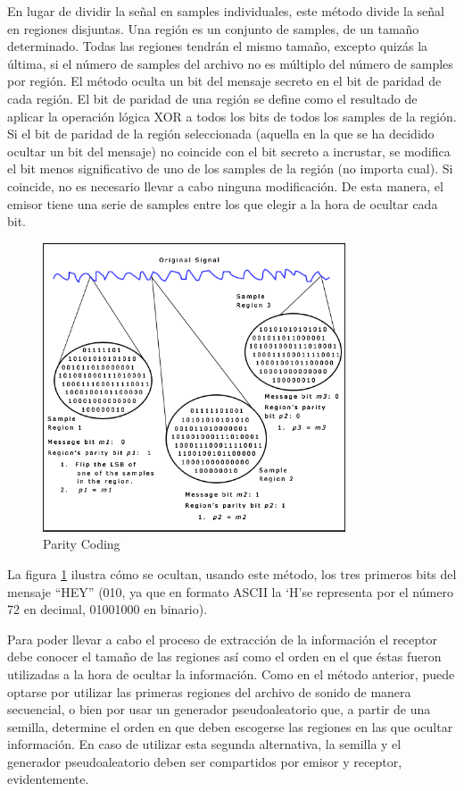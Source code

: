 \documentclass[12pt]{article}
\begin{document}
En lugar de dividir la señal en samples individuales, este método divide la señal en regiones disjuntas. Una región es un conjunto de samples, de un tamaño determinado. Todas las regiones tendrán el mismo tamaño, excepto quizás la última, si el número de samples del archivo no es múltiplo del número de samples por región. El método oculta un bit del mensaje secreto en el bit de paridad de cada región. El bit de paridad de una región se define como el resultado de aplicar la operación lógica XOR a todos los bits de todos los samples de la región. Si el bit de paridad de la región seleccionada (aquella en la que se ha decidido ocultar un bit del mensaje) no coincide con el bit secreto a incrustar, se modifica el bit menos significativo de uno de los samples de la región (no importa cual). Si coincide, no es necesario llevar a cabo ninguna modificación. De esta manera, el emisor tiene una serie de samples entre los que elegir a la hora de ocultar cada bit.

\begin{figure}
  \centering
    \includegraphics[width=0.8\textwidth]{img/parity}
  \caption{Parity Coding}
  \label{paritycoding}
\end{figure}

La figura \ref{paritycoding} ilustra cómo se ocultan, usando este método, los tres primeros bits del mensaje ``HEY'' (010, ya que en formato ASCII la `H'\space se representa por el número 72 en decimal, 01001000 en binario).

Para poder llevar a cabo el proceso de extracción de la información el receptor debe conocer el tamaño de las regiones así como el orden en el que éstas fueron utilizadas a la hora de ocultar la información. Como en el método anterior, puede optarse por utilizar las primeras regiones del archivo de sonido de manera secuencial, o bien por usar un generador pseudoaleatorio que, a partir de una semilla, determine el orden en que deben escogerse las regiones en las que ocultar información. En caso de utilizar esta segunda alternativa, la semilla y el generador pseudoaleatorio deben ser compartidos por emisor y receptor, evidentemente.
\end{document}
